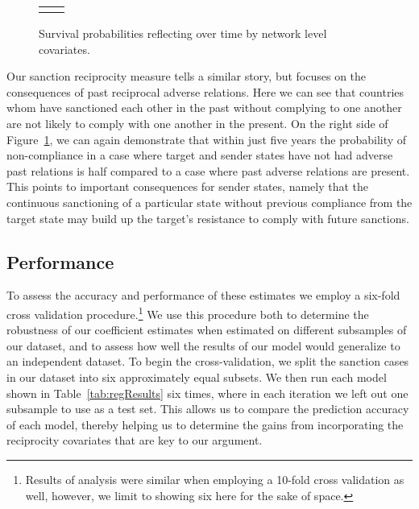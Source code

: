 \begin{figure}[ht]
	\centering
	\caption{Survival probabilities reflecting over time by network level covariates.}
	\begin{tabular}{cc}

	\subfloat[Subfigure 1][Compliance Reciprocity]{
		\resizebox{.45\textwidth}{!}{}
		\label{fig:compSancSurv}} & 
	
	\subfloat[Subfigure 2][Sanction Reciprocity]{
		\resizebox{.45\textwidth}{!}{}
		\label{fig:compSancSurv}}	

	\end{tabular}

	\label{fig:surv3}	
\end{figure}


Our sanction reciprocity measure tells a similar story, but focuses on the consequences of past reciprocal adverse relations. Here we can see that countries whom have sanctioned each other in the past without complying to one another are not likely to comply with one another in the present. On the right side of Figure~\ref{fig:surv3}, we can again demonstrate that within just five years the probability of non-compliance in a case where target and sender states have not had adverse past relations is half compared to a case where past adverse relations are present. This points to important consequences for sender states, namely that the continuous sanctioning of a particular state without previous compliance from the target state may build up the target's resistance to comply with future sanctions.

\subsection*{Performance}

To assess the accuracy and performance of these estimates we employ a six-fold cross validation procedure.\footnote{Results of analysis were similar when employing a 10-fold cross validation as well, however, we limit to showing six here for the sake of space.} We use this procedure both to determine the robustness of our coefficient estimates when estimated on different subsamples of our dataset, and to assess how well the results of our model would generalize to an independent dataset. To begin the cross-validation, we split the sanction cases in our dataset into six approximately equal subsets. We then run each model shown in Table~\ref{tab:regResults} six times, where in each iteration we left out one subsample to use as a test set. This allows us to compare the prediction accuracy of each model, thereby helping us to determine the gains from incorporating the reciprocity covariates that are key to our argument.

